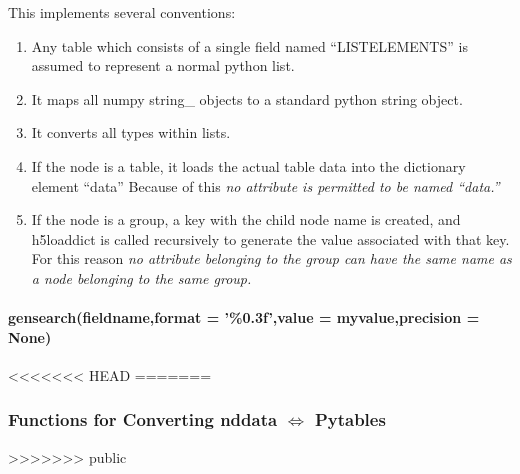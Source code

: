This implements several conventions:
\begin{mykwargs}
    \begin{enumerate}
        \item Any table which consists of a single field
            named ``LISTELEMENTS'' is assumed to represent
            a normal python list.
        \item  It maps all numpy string\_ objects
            to a standard python string object.
        \item It converts all types within lists. 
        \item If the node is a table, it loads the actual
            table data into the dictionary element ``data''
            Because of this \textit{no attribute is permitted
            to be named ``data.''}
        \item If the node is a group, a key with the child node
            name is created, and h5loaddict is called recursively
            to generate the value associated with that key.
            For this reason \textit{no attribute belonging to the
            group can have the same name as a node belonging to the
            same group.}
    \end{enumerate}
\end{mykwargs}
\paragraph{gensearch(fieldname,format = '\%0.3f',value = myvalue,precision = None)}
<<<<<<< HEAD
=======
\subsubsection{Functions for Converting nddata $\Leftrightarrow$
    Pytables}
>>>>>>> public

